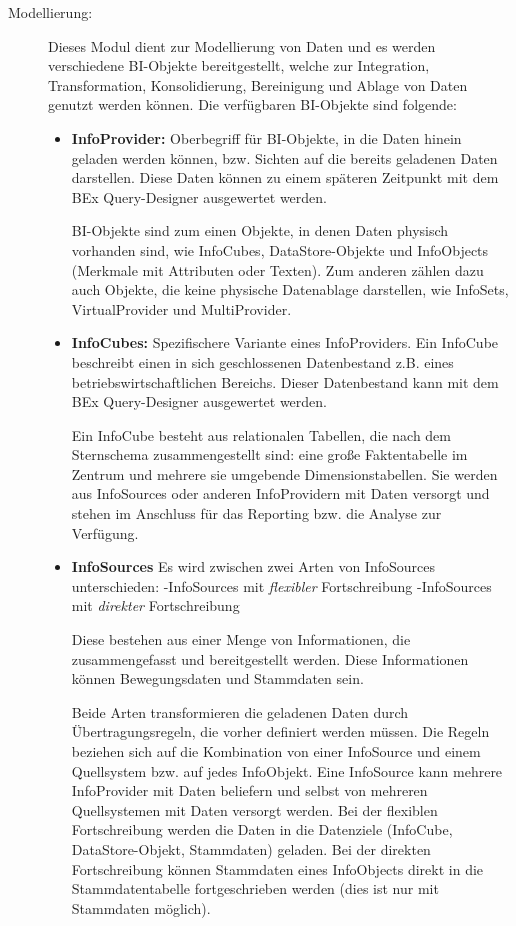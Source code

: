 \begin{description}
\item[Modellierung:] Dieses Modul dient zur Modellierung von Daten und es werden verschiedene BI-Objekte bereitgestellt, welche zur Integration, Transformation, Konsolidierung, Bereinigung und Ablage von Daten genutzt werden können. Die verfügbaren BI-Objekte sind folgende:
\begin{itemize}
\item \textbf{InfoProvider:}
Oberbegriff für BI-Objekte, in die Daten hinein geladen werden können, bzw. Sichten auf die bereits geladenen Daten darstellen. Diese Daten können zu einem späteren Zeitpunkt mit dem BEx Query-Designer ausgewertet werden.

BI-Objekte sind zum einen Objekte, in denen Daten physisch vorhanden sind, wie InfoCubes, DataStore-Objekte und InfoObjects (Merkmale mit Attributen oder Texten). Zum anderen zählen dazu auch Objekte, die keine physische Datenablage darstellen, wie InfoSets, VirtualProvider und MultiProvider.

\item \textbf{InfoCubes:}
Spezifischere Variante eines InfoProviders.
Ein InfoCube beschreibt einen in sich geschlossenen Datenbestand z.B. eines betriebswirtschaftlichen Bereichs. Dieser Datenbestand kann mit dem BEx Query-Designer ausgewertet werden.

Ein InfoCube besteht aus relationalen Tabellen, die nach dem Sternschema zusammengestellt sind: eine große Faktentabelle im Zentrum und mehrere sie umgebende Dimensionstabellen.
Sie werden aus InfoSources oder anderen InfoProvidern mit Daten versorgt und stehen im Anschluss für das Reporting bzw. die Analyse zur Verfügung.

\item \textbf{InfoSources}
Es wird zwischen zwei Arten von InfoSources unterschieden:
-InfoSources mit \textit{flexibler} Fortschreibung
-InfoSources mit \textit{direkter} Fortschreibung

Diese bestehen aus einer Menge von Informationen, die zusammengefasst und bereitgestellt werden. Diese Informationen können Bewegungsdaten und Stammdaten sein.

Beide Arten transformieren die geladenen Daten durch Übertragungsregeln, die vorher definiert werden müssen. Die Regeln beziehen sich auf die Kombination von einer InfoSource und einem Quellsystem bzw. auf jedes InfoObjekt. Eine InfoSource kann mehrere InfoProvider mit Daten beliefern und selbst von mehreren Quellsystemen mit Daten versorgt werden.
Bei der flexiblen Fortschreibung werden die Daten in die Datenziele (InfoCube, DataStore-Objekt, Stammdaten) geladen.
Bei der direkten Fortschreibung können Stammdaten eines InfoObjects direkt in die Stammdatentabelle fortgeschrieben werden (dies ist nur mit Stammdaten möglich).


\end{itemize}
\end{description}
